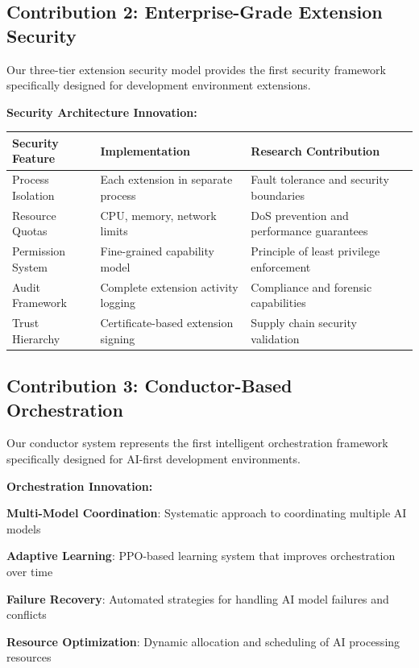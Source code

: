 \subsection{Contribution 2: Enterprise-Grade Extension Security}
\label{subsec:security-contribution}

Our three-tier extension security model provides the first security framework specifically designed for development environment extensions.

\textbf{Security Architecture Innovation:}

\begin{center}
\begin{tabular}{@{}p{3cm}p{4cm}p{5cm}@{}}
\toprule
\textbf{Security Feature} & \textbf{Implementation} & \textbf{Research Contribution} \\
\midrule
Process Isolation & Each extension in separate process & Fault tolerance and security boundaries \\
Resource Quotas & CPU, memory, network limits & DoS prevention and performance guarantees \\
Permission System & Fine-grained capability model & Principle of least privilege enforcement \\
Audit Framework & Complete extension activity logging & Compliance and forensic capabilities \\
Trust Hierarchy & Certificate-based extension signing & Supply chain security validation \\
\bottomrule
\end{tabular}
\label{tab:security-contributions}
\end{center}

\subsection{Contribution 3: Conductor-Based Orchestration}
\label{subsec:orchestration-contribution}

Our conductor system represents the first intelligent orchestration framework specifically designed for AI-first development environments.

\textbf{Orchestration Innovation:}

\begin{compactlist}
    \item \textbf{Multi-Model Coordination}: Systematic approach to coordinating multiple AI models
    \item \textbf{Adaptive Learning}: PPO-based learning system that improves orchestration over time
    \item \textbf{Failure Recovery}: Automated strategies for handling AI model failures and conflicts
    \item \textbf{Resource Optimization}: Dynamic allocation and scheduling of AI processing resources
\end{compactlist}

